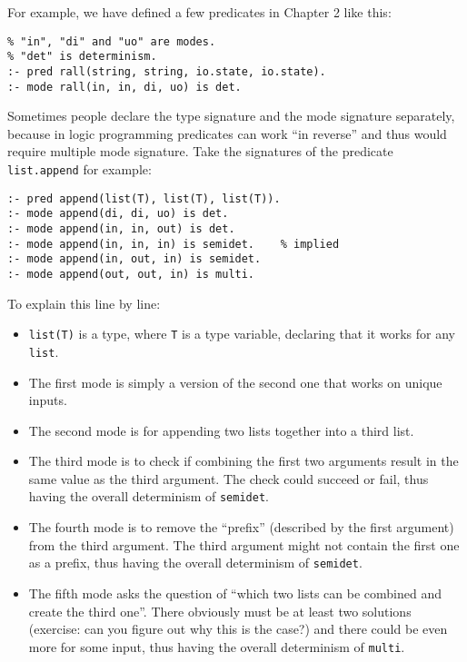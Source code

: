 For example, we have defined a few predicates in Chapter 2 like this:

\begin{lstlisting}[language=Mercury]
% "string" and "io.state" are types.
% "in", "di" and "uo" are modes.
% "det" is determinism.
:- pred rall(string, string, io.state, io.state).
:- mode rall(in, in, di, uo) is det.
\end{lstlisting}

Sometimes people declare the type signature and the mode signature separately, because in logic programming predicates can work ``in reverse'' and thus would require multiple mode signature. Take the signatures of the predicate \texttt{list.append} for example:

\begin{lstlisting}[language=Mercury]
:- pred append(list(T), list(T), list(T)).
:- mode append(di, di, uo) is det.
:- mode append(in, in, out) is det.
:- mode append(in, in, in) is semidet.    % implied
:- mode append(in, out, in) is semidet.
:- mode append(out, out, in) is multi.
\end{lstlisting}

To explain this line by line:

\begin{itemize}
\item \texttt{list(T)} is a type, where \texttt{T} is a type variable, declaring that it works for any \texttt{list}.
\item The first mode is simply a version of the second one that works on unique inputs.
\item The second mode is for appending two lists together into a third list.
\item The third mode is to check if combining the first two arguments result in the same value as the third argument. The check could succeed or fail, thus having the overall determinism of \texttt{semidet}.
\item The fourth mode is to remove the ``prefix'' (described by the first argument) from the third argument. The third argument might not contain the first one as a prefix, thus having the overall determinism of \texttt{semidet}.
  \item The fifth mode asks the question of ``which two lists can be combined and create the third one''. There obviously must be at least two solutions (exercise: can you figure out why this is the case?) and there could be even more for some input, thus having the overall determinism of \texttt{multi}.
  \end{itemize}


